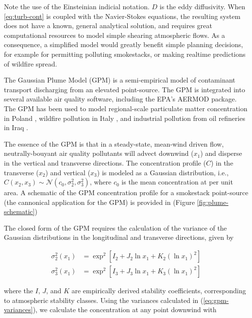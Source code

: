 \documentclass[]{aiaa-tc}%
\newcommand{\eqnref}[1]{(\ref{#1})}
\newcommand{\figref}[1]{(Figure \ref{#1})}
\begin{document}
Note the use of the Einsteinian indicial notation. $D$ is the eddy diffusivity. When \ref{eq:turb-cont} is coupled with the Navier-Stokes equations, the resulting system does not have a known, general analytical solution, and requires great computational resources to model simple shearing atmospheric flows. As a consequence, a simplified model would greatly benefit simple planning decisions, for example for permitting polluting smokestacks, or making realtime predictions of wildfire spread. 

The Gaussian Plume Model (GPM) \cite{sinha_application_2025} is a semi-empirical model of contaminant transport discharging from an elevated point-source. The GPM is integrated into several available air quality software, including the EPA's AERMOD \cite{cimorelli_aermod_2005} package. The GPM has been used to model regional-scale particulate matter concentration in Poland \cite{kawka_downscaling_2023}, wildfire pollution in Italy \cite{lotrecchiano_pollution_2020}, and industrial pollution from oil refineries in Iraq \cite{salih_air_2025}.

The essence of the GPM is that in a steady-state, mean-wind driven flow, neutrally-bouyant air quality pollutants will advect downwind ($x_1$) and disperse in the vertical and transverse directions. The concentration profile ($C$) in the transverse ($x_2$) and vertical ($x_3$) is modeled as a Gaussian distribution, i.e., $C(x_2, x_3) \sim \mathcal{N}(c_0, \sigma_2^2, \sigma_3^2)$, where $c_0$ is the mean concentration at per unit area. A schematic of the GPM concentration profile for a smokestack point-source (the cannonical application for the GPM) is provided in \figref{fig:plume-schematic}

The closed form of the GPM requires the calculation of the variance of the Gaussian distributions in the longitudinal and transverse directions, given by

\begin{equation} \label{eq:gpm-variances}
  \begin{aligned}
    \sigma_2^2 (x_1) &= \exp^2 \left[ I_2 + J_2 \ln x_1 + K_2 \left( \ln x_1 \right)^2 \right] \\
    \sigma_3^2 (x_1) &= \exp^2 \left[ I_3 + J_3 \ln x_1 + K_3 \left( \ln x_1 \right)^2 \right]
  \end{aligned}
\end{equation}

where the $I$, $J$, and $K$ are empirically derived stability coefficients, corresponding to atmospheric stability classes. Using the variances calculated in \eqnref{eq:gpm-variances}, we calculate the concentration at any point downwind with
\end{document}
